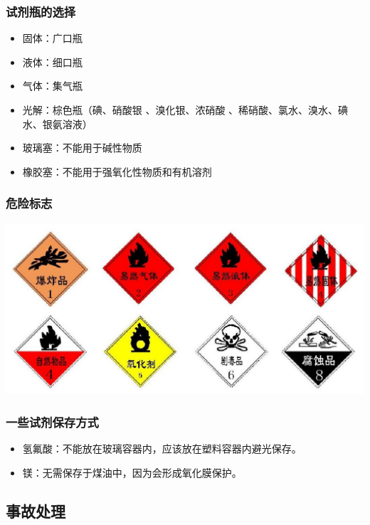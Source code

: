 \documentclass[10pt]{article}
\begin{document}
	\subsubsection{试剂瓶的选择}
	
	\begin{itemize}
		\item 固体：广口瓶
		\item 液体：细口瓶
		\item 气体：集气瓶
		\item 光解：棕色瓶（碘、硝酸银 、溴化银、浓硝酸 、稀硝酸、氯水、溴水、碘水、银氨溶液）
		\item 玻璃塞：不能用于碱性物质
		\item 橡胶塞：不能用于强氧化性物质和有机溶剂
	\end{itemize}
	
	\subsubsection{危险标志}
	
	\begin{center}
		\includegraphics[scale=0.38]{res/hazard}
	\end{center}
	
	\subsubsection{一些试剂保存方式}
	
	\begin{itemize}
		\item 氢氟酸：不能放在玻璃容器内，应该放在塑料容器内避光保存。
		\item 镁：无需保存于煤油中，因为会形成氧化膜保护。
	\end{itemize}
	
	
	\subsection{事故处理}
	
\end{document}
